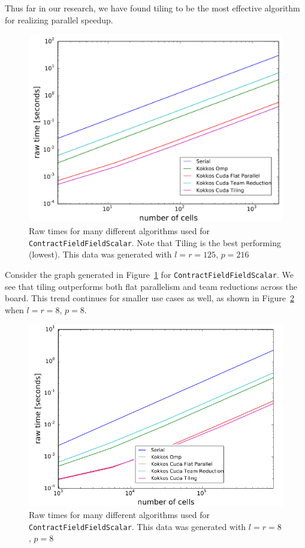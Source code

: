 Thus far in our research, we have found tiling to be the most effective
algorithm for realizing parallel speedup. 

\begin{figure}[H]
    \centering
\includegraphics[scale = 1]{CFFS_RawTimes_LR125P216_2.PNG} 
\caption[\texttt{ContractFieldFieldScalar} performance summary (large)]{Raw times
    for many different algorithms used for \texttt{ContractFieldFieldScalar}.
    Note that Tiling is the best performing (lowest). This data was generated
    with
    $l=r=125$, $p=216$}
\label{fig:TilingPerformance}
\end{figure}
Consider the graph generated in Figure~\ref{fig:TilingPerformance} for \texttt{ContractFieldFieldScalar}. We see that tiling outperforms both flat parallelism and team reductions across the board. This trend continues for smaller use cases as well, as shown in Figure~\ref{fig:TilingPerformance2} when $l = r = 8$, $p = 8$.

\begin{figure}[H]
    \centering
    \includegraphics[scale = .55]{CFFS_RawTimes_LRP8_2.PNG}
    \caption[\texttt{ContractFieldFieldScalar} performance summary (small)]{Raw
        times for many different algorithms used for \texttt{ContractFieldFieldScalar}.
        This data was generated with $l=r=8$, $p=8$}
\label{fig:TilingPerformance2}
\end{figure}

